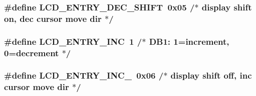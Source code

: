 \subsubsection[{\texorpdfstring{L\+C\+D\+\_\+\+E\+N\+T\+R\+Y\+\_\+\+D\+E\+C\+\_\+\+S\+H\+I\+FT}{LCD_ENTRY_DEC_SHIFT}}]{\setlength{\rightskip}{0pt plus 5cm}\#define L\+C\+D\+\_\+\+E\+N\+T\+R\+Y\+\_\+\+D\+E\+C\+\_\+\+S\+H\+I\+FT~0x05   /$\ast$ display shift on,  dec cursor move dir $\ast$/}\hypertarget{group__pfleury__lcd_ga1c62932f252c6262cbef728add9696e4}{}\label{group__pfleury__lcd_ga1c62932f252c6262cbef728add9696e4}
\subsubsection[{\texorpdfstring{L\+C\+D\+\_\+\+E\+N\+T\+R\+Y\+\_\+\+I\+NC}{LCD_ENTRY_INC}}]{\setlength{\rightskip}{0pt plus 5cm}\#define L\+C\+D\+\_\+\+E\+N\+T\+R\+Y\+\_\+\+I\+NC~1      /$\ast$   D\+B1\+: 1=increment, 0=decrement     $\ast$/}\hypertarget{group__pfleury__lcd_gada766266a0be0d0040fbf86e23b58aa6}{}\label{group__pfleury__lcd_gada766266a0be0d0040fbf86e23b58aa6}
\subsubsection[{\texorpdfstring{L\+C\+D\+\_\+\+E\+N\+T\+R\+Y\+\_\+\+I\+N\+C\+\_\+}{LCD_ENTRY_INC_}}]{\setlength{\rightskip}{0pt plus 5cm}\#define L\+C\+D\+\_\+\+E\+N\+T\+R\+Y\+\_\+\+I\+N\+C\+\_\+~0x06   /$\ast$ display shift off, inc cursor move dir $\ast$/}\hypertarget{group__pfleury__lcd_gad27ddc4b8d03594662c8757f946dde28}{}\label{group__pfleury__lcd_gad27ddc4b8d03594662c8757f946dde28}
